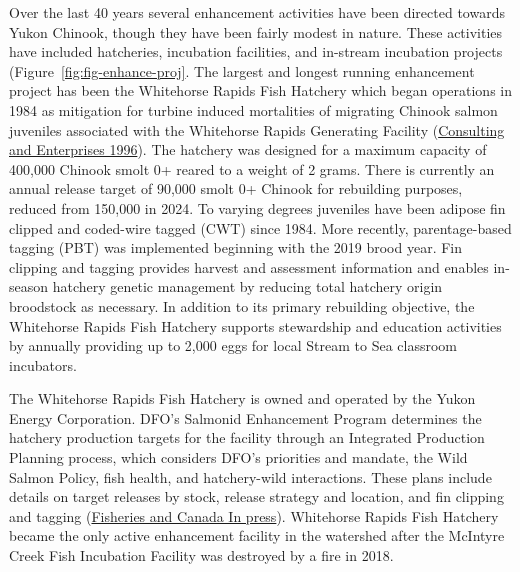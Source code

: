 \documentclass[11pt]{book}
\begin{document}
Over the last 40 years several enhancement activities have been directed towards Yukon Chinook, though they have been fairly modest in nature. These activities have included hatcheries, incubation facilities, and in-stream incubation projects (Figure~\ref{fig:fig-enhance-proj}. The largest and longest running enhancement project has been the Whitehorse Rapids Fish Hatchery which began operations in 1984 as mitigation for turbine induced mortalities of migrating Chinook salmon juveniles associated with the Whitehorse Rapids Generating Facility (\protect\hyperlink{ref-ricks1996}{Consulting and Enterprises 1996}). The hatchery was designed for a maximum capacity of 400,000 Chinook smolt 0+ reared to a weight of 2 grams. There is currently an annual release target of 90,000 smolt 0+ Chinook for rebuilding purposes, reduced from 150,000 in 2024. To varying degrees juveniles have been adipose fin clipped and coded-wire tagged (CWT) since 1984. More recently, parentage-based tagging (PBT) was implemented beginning with the 2019 brood year. Fin clipping and tagging provides harvest and assessment information and enables in-season hatchery genetic management by reducing total hatchery origin broodstock as necessary. In addition to its primary rebuilding objective, the Whitehorse Rapids Fish Hatchery supports stewardship and education activities by annually providing up to 2,000 eggs for local Stream to Sea classroom incubators.

The Whitehorse Rapids Fish Hatchery is owned and operated by the Yukon Energy Corporation. DFO's Salmonid Enhancement Program determines the hatchery production targets for the facility through an Integrated Production Planning process, which considers DFO's priorities and mandate, the Wild Salmon Policy, fish health, and hatchery-wild interactions. These plans include details on target releases by stock, release strategy and location, and fin clipping and tagging (\protect\hyperlink{ref-sep_data_tables}{Fisheries and Canada In press}). Whitehorse Rapids Fish Hatchery became the only active enhancement facility in the watershed after the McIntyre Creek Fish Incubation Facility was destroyed by a fire in 2018.
\end{document}
